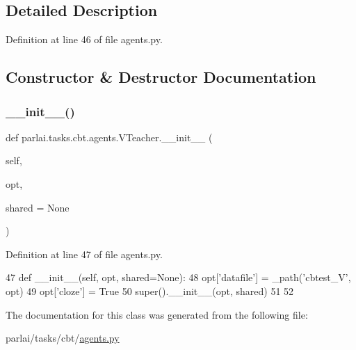 \subsection{Detailed Description}


Definition at line 46 of file agents.\+py.



\subsection{Constructor \& Destructor Documentation}
\mbox{\label{classparlai_1_1tasks_1_1cbt_1_1agents_1_1VTeacher_a19797ded538cc0a6d4cd544c4e2b6b1b}} 
\subsubsection{\texorpdfstring{\+\_\+\+\_\+init\+\_\+\+\_\+()}{\_\_init\_\_()}}
{\footnotesize\ttfamily def parlai.\+tasks.\+cbt.\+agents.\+V\+Teacher.\+\_\+\+\_\+init\+\_\+\+\_\+ (\begin{DoxyParamCaption}\item[{}]{self,  }\item[{}]{opt,  }\item[{}]{shared = {\ttfamily None} }\end{DoxyParamCaption})}



Definition at line 47 of file agents.\+py.


\begin{DoxyCode}
47     \textcolor{keyword}{def }\_\_init\_\_(self, opt, shared=None):
48         opt[\textcolor{stringliteral}{'datafile'}] = \_path(\textcolor{stringliteral}{'cbtest\_V'}, opt)
49         opt[\textcolor{stringliteral}{'cloze'}] = \textcolor{keyword}{True}
50         super().\_\_init\_\_(opt, shared)
51 
52 
\end{DoxyCode}


The documentation for this class was generated from the following file\+:\begin{DoxyCompactItemize}
\item 
parlai/tasks/cbt/\hyperlink{parlai_2tasks_2cbt_2agents_8py}{agents.\+py}\end{DoxyCompactItemize}
